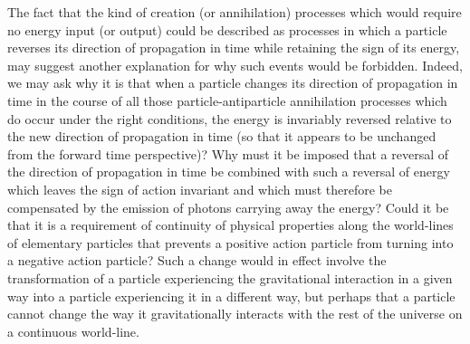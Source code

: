 \documentclass[notitlepage,12pt]{report}
\begin{document}
The fact that the kind of creation (or annihilation) processes which would require no energy input (or output) could be described as processes in which a particle reverses its direction of propagation in time while retaining the sign of its energy, may suggest another explanation for why such events would be forbidden. Indeed, we may ask why it is that when a particle changes its direction of propagation in time in the course of all those particle-antiparticle annihilation processes which do occur under the right conditions, the energy is invariably reversed relative to the new direction of propagation in time (so that it appears to be unchanged from the forward time perspective)? Why must it be imposed that a reversal of the direction of propagation in time be combined with such a reversal of energy which leaves the sign of action invariant and which must therefore be compensated by the emission of photons carrying away the energy? Could it be that it is a requirement of continuity of physical properties along the world-lines of elementary particles that prevents a positive action particle from turning into a negative action particle? Such a change would in effect involve the transformation of a particle experiencing the gravitational interaction in a given way into a particle experiencing it in a different way, but perhaps that a particle cannot change the way it gravitationally interacts with the rest of the universe on a continuous world-line.
\end{document}
